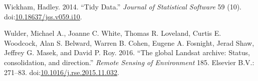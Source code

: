 \documentclass[]{article}
\begin{document}
\hypertarget{ref-Wickham2014}{}
Wickham, Hadley. 2014. ``Tidy Data.'' \emph{Journal of Statistical
Software} 59 (10).
doi:\href{https://doi.org/10.18637/jss.v059.i10}{10.18637/jss.v059.i10}.

\hypertarget{ref-Wulder2016}{}
Wulder, Michael A., Joanne C. White, Thomas R. Loveland, Curtis E.
Woodcock, Alan S. Belward, Warren B. Cohen, Eugene A. Fosnight, Jerad
Shaw, Jeffrey G. Masek, and David P. Roy. 2016. ``The global Landsat
archive: Status, consolidation, and direction.'' \emph{Remote Sensing of
Environment} 185. Elsevier B.V.: 271--83.
doi:\href{https://doi.org/10.1016/j.rse.2015.11.032}{10.1016/j.rse.2015.11.032}.
\end{document}
